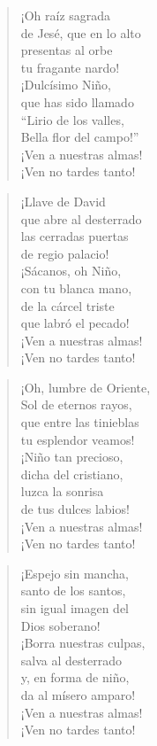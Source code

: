 \documentclass[spanish,utf8,12pt]{chlart}
\newenvironment{gozo}{\begin{verse}\color{lector}}{\end{verse}}
\newcommand*\vena{{\color{responden}\hspace{1em}¡Ven a nuestras almas!\\\hspace{1em}¡Ven no tardes tanto!}}
\begin{document}
\begin{gozo}
¡Oh raíz sagrada\\
de Jesé, que en lo alto\\
presentas al orbe\\
tu fragante nardo!\\
¡Dulcísimo Niño,\\
que has sido llamado\\
“Lirio de los valles,\\
Bella flor del campo!”\\
\vena
\end{gozo}

\begin{gozo}
¡Llave de David\\
que abre al desterrado\\
las cerradas puertas\\
de regio palacio!\\
¡Sácanos, oh Niño,\\
con tu blanca mano,\\
de la cárcel triste\\
que labró el pecado!\\
\vena
\end{gozo}

\begin{gozo}
¡Oh, lumbre de Oriente,\\
Sol de eternos rayos,\\
que entre las tinieblas\\
tu esplendor veamos!\\
¡Niño tan precioso,\\
dicha del cristiano,\\
luzca la sonrisa\\
de tus dulces labios!\\
\vena
\end{gozo}

\begin{gozo}
¡Espejo sin mancha,\\
santo de los santos,\\
sin igual imagen del\\
Dios soberano!\\
¡Borra nuestras culpas,\\
salva al desterrado\\
y, en forma de niño,\\
da al mísero amparo!\\
\vena
\end{gozo}
\end{document}

